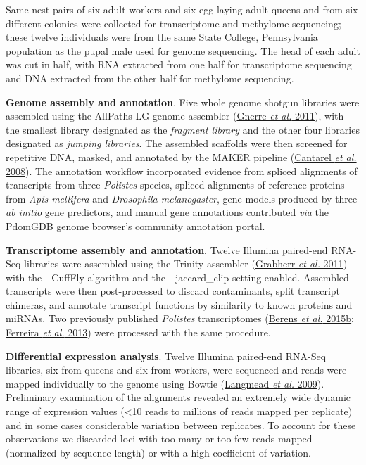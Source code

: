 \documentclass[]{article}
\begin{document}
Same-nest pairs of six adult workers and six egg-laying adult queens and
from six different colonies were collected for transcriptome and
methylome sequencing; these twelve individuals were from the same State
College, Pennsylvania population as the pupal male used for genome
sequencing. The head of each adult was cut in half, with RNA extracted
from one half for transcriptome sequencing and DNA extracted from the
other half for methylome sequencing.

\textbf{Genome assembly and annotation}. Five whole genome shotgun
libraries were assembled using the AllPaths-LG genome assembler
(\protect\hyperlink{ux5fENREFux5f14}{Gnerre \emph{et al.} 2011}), with
the smallest library designated as the \emph{fragment library} and the
other four libraries designated as \emph{jumping libraries}. The
assembled scaffolds were then screened for repetitive DNA, masked, and
annotated by the MAKER pipeline
(\protect\hyperlink{ux5fENREFux5f7}{Cantarel \emph{et al.} 2008}). The
annotation workflow incorporated evidence from spliced alignments of
transcripts from three \emph{Polistes} species, spliced alignments of
reference proteins from \emph{Apis mellifera} and \emph{Drosophila
melanogaster}, gene models produced by three \emph{ab initio} gene
predictors, and manual gene annotations contributed \emph{via} the
PdomGDB genome browser's community annotation portal.

\textbf{Transcriptome assembly and annotation}. Twelve Illumina
paired-end RNA-Seq libraries were assembled using the Trinity assembler
(\protect\hyperlink{ux5fENREFux5f15}{Grabherr \emph{et al.} 2011}) with
the -\/-CuffFly algorithm and the -\/-jaccard\_clip setting enabled.
Assembled transcripts were then post-processed to discard contaminants,
split transcript chimeras, and annotate transcript functions by
similarity to known proteins and miRNAs. Two previously published
\emph{Polistes} transcriptomes
(\protect\hyperlink{ux5fENREFux5f3}{Berens \emph{et al.} 2015b};
\protect\hyperlink{ux5fENREFux5f10}{Ferreira \emph{et al.} 2013}) were
processed with the same procedure.

\textbf{Differential expression analysis}. Twelve Illumina paired-end
RNA-Seq libraries, six from queens and six from workers, were sequenced
and reads were mapped individually to the genome using Bowtie
(\protect\hyperlink{ux5fENREFux5f29}{Langmead \emph{et al.} 2009}).
Preliminary examination of the alignments revealed an extremely wide
dynamic range of expression values (\textless{}10 reads to millions of
reads mapped per replicate) and in some cases considerable variation
between replicates. To account for these observations we discarded loci
with too many or too few reads mapped (normalized by sequence length) or
with a high coefficient of variation.
\end{document}
